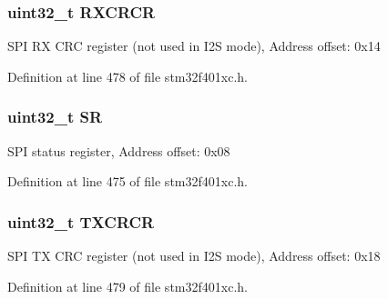 \subsubsection[{\texorpdfstring{R\+X\+C\+R\+CR}{RXCRCR}}]{ uint32\+\_\+t R\+X\+C\+R\+CR}\hypertarget{struct_s_p_i___type_def_a2cf9dcd9008924334f20f0dc6b57042e}{}\label{struct_s_p_i___type_def_a2cf9dcd9008924334f20f0dc6b57042e}
S\+PI RX C\+RC register (not used in I2S mode), Address offset\+: 0x14 

Definition at line 478 of file stm32f401xc.\+h.

\subsubsection[{\texorpdfstring{SR}{SR}}]{ uint32\+\_\+t SR}\hypertarget{struct_s_p_i___type_def_af6aca2bbd40c0fb6df7c3aebe224a360}{}\label{struct_s_p_i___type_def_af6aca2bbd40c0fb6df7c3aebe224a360}
S\+PI status register, Address offset\+: 0x08 

Definition at line 475 of file stm32f401xc.\+h.

\subsubsection[{\texorpdfstring{T\+X\+C\+R\+CR}{TXCRCR}}]{ uint32\+\_\+t T\+X\+C\+R\+CR}\hypertarget{struct_s_p_i___type_def_ab4e4328504fd66285df8264d410deefd}{}\label{struct_s_p_i___type_def_ab4e4328504fd66285df8264d410deefd}
S\+PI TX C\+RC register (not used in I2S mode), Address offset\+: 0x18 

Definition at line 479 of file stm32f401xc.\+h.



